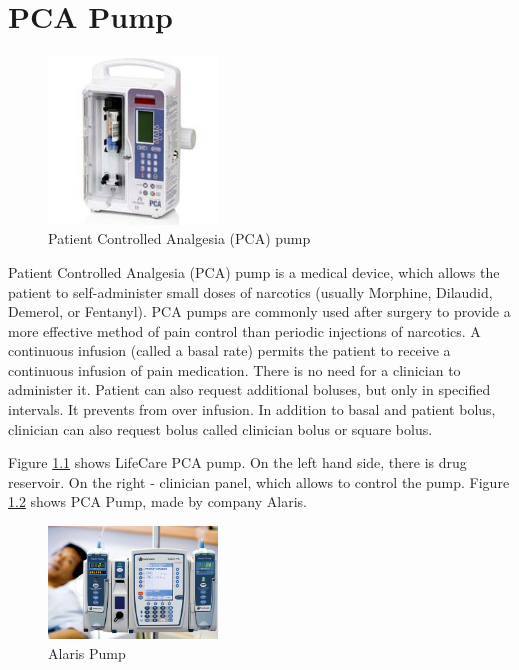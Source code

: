 
\cleardoublepage


\chapter{PCA Pump}
\label{pcapump}


\begin{figure}
  \begin{center}
    \includegraphics[width=0.4\textwidth]{figures/pca-pump.png}
  \end{center}
  \caption{Patient Controlled Analgesia (PCA) pump}
  \label{figure:pca-pump}
\end{figure}

Patient Controlled Analgesia (PCA) pump is a medical device, which allows the patient to self-administer small doses of narcotics (usually Morphine, Dilaudid, Demerol, or Fentanyl). PCA pumps are commonly used after surgery to provide a more effective method of pain control than periodic injections of narcotics. A continuous infusion (called a basal rate) permits the patient to receive a continuous infusion of pain medication. There is no need for a clinician to administer it. Patient can also request additional boluses, but only in specified intervals. It prevents from over infusion. In addition to basal and patient bolus, clinician can also request bolus called clinician bolus or square bolus. 

Figure \ref{figure:pca-pump} shows LifeCare PCA pump. On the left hand side, there is drug reservoir. On the right -  clinician panel, which allows to control the pump. Figure \ref{figure:alaris-pump} shows PCA Pump, made by company Alaris. 

\begin{figure}
  \begin{center}
    \includegraphics[width=0.4\textwidth]{figures/alaris-pump.png}
  \end{center}
  \caption{Alaris Pump}
  \label{figure:alaris-pump}
\end{figure}

